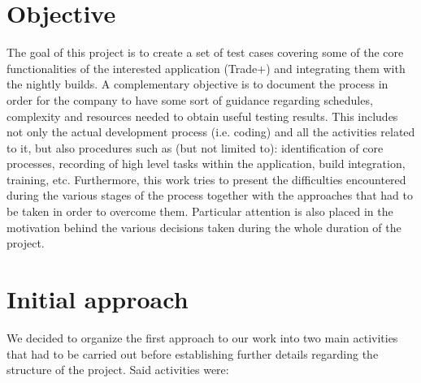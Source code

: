\section{Objective} 

The goal of this project is to create a set of test cases covering some of the core functionalities of the interested application (Trade+) and integrating them with the nightly builds. A complementary objective is to document the process in order for the company to have some sort of guidance regarding schedules, complexity and resources needed to obtain useful testing results. 
This includes not only the actual development process (i.e. coding) and all the activities related to it, but also procedures such as (but not limited to): identification of core processes, recording of high level tasks within the application, build integration, training, etc. 
Furthermore, this work tries to present the difficulties encountered during the various stages of the process together with the approaches that had to be taken in order to overcome them. Particular attention is also placed in the motivation behind the various decisions taken during the whole duration of the project.

\section{Initial approach}

We decided to organize the first approach to our work into two main activities that had to be carried out before establishing further details regarding the structure of the project. Said activities were:

